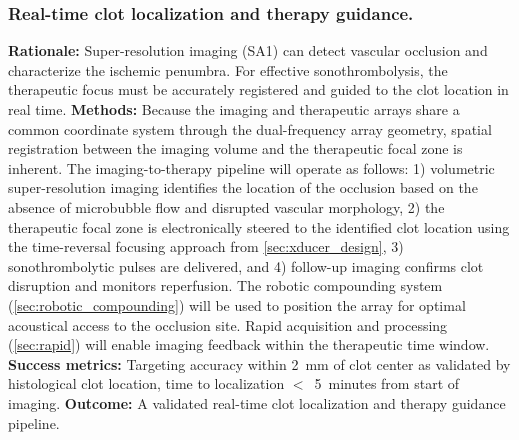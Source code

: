 \subsubsection{Real-time clot localization and therapy guidance.\label{sec:clot_targeting}}
\textbf{Rationale:} Super-resolution imaging (SA1) can detect vascular occlusion and characterize the ischemic penumbra. For effective sonothrombolysis, the therapeutic focus must be accurately registered and guided to the clot location in real time. \textbf{Methods:} Because the imaging and therapeutic arrays share a common coordinate system through the dual-frequency array geometry, spatial registration between the imaging volume and the therapeutic focal zone is inherent. The imaging-to-therapy pipeline will operate as follows: 1) volumetric super-resolution imaging identifies the location of the occlusion based on the absence of microbubble flow and disrupted vascular morphology, 2) the therapeutic focal zone is electronically steered to the identified clot location using the time-reversal focusing approach from \ref{sec:xducer_design}, 3) sonothrombolytic pulses are delivered, and 4) follow-up imaging confirms clot disruption and monitors reperfusion. The robotic compounding system (\ref{sec:robotic_compounding}) will be used to position the array for optimal acoustical access to the occlusion site. Rapid acquisition and processing (\ref{sec:rapid}) will enable imaging feedback within the therapeutic time window. \textbf{Success metrics:} Targeting accuracy within 2~mm of clot center as validated by histological clot location, time to localization $<$~5~minutes from start of imaging. \textbf{Outcome:} A validated real-time clot localization and therapy guidance pipeline.

